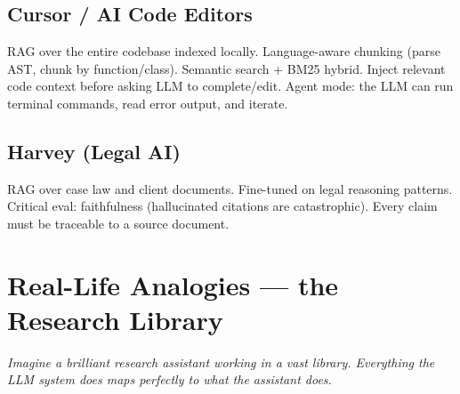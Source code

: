 \documentclass[11pt]{article}
\begin{document}
\subsection{Cursor / AI Code Editors}\label{cursor--ai-code-editors}

RAG over the entire codebase indexed locally. Language-aware chunking (parse AST, chunk by function/class). Semantic search + BM25 hybrid. Inject relevant code context before asking LLM to complete/edit. Agent mode: the LLM can run terminal commands, read error output, and iterate.

\subsection{Harvey (Legal AI)}\label{harvey-legal-ai}

RAG over case law and client documents. Fine-tuned on legal reasoning patterns. Critical eval: faithfulness (hallucinated citations are catastrophic). Every claim must be traceable to a source document.

\section{Real-Life Analogies --- the Research Library}\label{real-life-analogies--the-research-library}

\emph{Imagine a brilliant research assistant working in a vast library. Everything the LLM system does maps perfectly to what the assistant does.}
\end{document}
